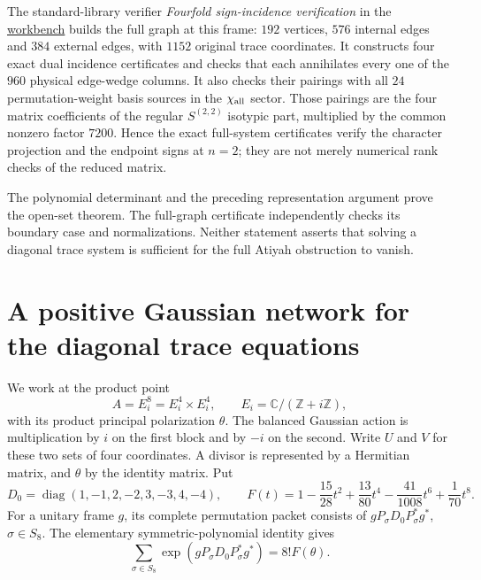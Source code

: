 \documentclass[11pt]{article}
\theoremstyle{definition}
\theoremstyle{remark}
\newcommand{\workbenchurl}{https://github.com/KokunoYumeto/algebraic-cycles-and-motives-workbench}
\begin{document}
The standard-library verifier
\emph{Fourfold sign-incidence verification} in the \href{\workbenchurl}{workbench} builds the full graph at this
frame: $192$ vertices, $576$ internal edges and $384$ external edges,
with $1152$ original trace coordinates.  It constructs four exact dual
incidence certificates and checks that each annihilates every one of the
$960$ physical edge-wedge columns.  It also checks their pairings with
all $24$ permutation-weight basis sources in the
$\chi_{\rm all}$ sector.  Those pairings are the four matrix
coefficients of the regular $S^{(2,2)}$ isotypic part, multiplied by the
common nonzero factor $7200$.  Hence the exact full-system certificates
verify the character projection and the endpoint signs at $n=2$;
they are not merely numerical rank checks of the reduced matrix.

The polynomial determinant and the preceding representation argument
prove the open-set theorem.  The full-graph certificate independently
checks its boundary case and normalizations.  Neither statement asserts
that solving a diagonal trace system is sufficient for the full Atiyah
obstruction to vanish.

\section{A positive Gaussian network for the diagonal trace equations}
\label{sec:gaussian-trace-network}

We work at the product point
\[
 A=E_i^8=E_i^4\times E_i^4,
 \qquad E_i=\mathbb C/(\mathbb Z+i\mathbb Z),
\]
with its product principal polarization \(\theta\).  The balanced
Gaussian action is multiplication by \(i\) on the first block and by
\(-i\) on the second.  Write \(U\) and \(V\) for these two sets of four
coordinates.  A divisor is represented by a Hermitian matrix, and
\(\theta\) by the identity matrix.  Put
\[
 D_0=\operatorname{diag}(1,-1,2,-2,3,-3,4,-4),\qquad
 F(t)=1-\frac{15}{28}t^2+\frac{13}{80}t^4
       -\frac{41}{1008}t^6+\frac1{70}t^8.
\]
For a unitary frame \(g\), its complete permutation packet consists
of \(gP_\sigma D_0P_\sigma^*g^*\), \(\sigma\in S_8\).
The elementary symmetric-polynomial identity gives
\begin{equation}
 \sum_{\sigma\in S_8}
   \exp(gP_\sigma D_0P_\sigma^*g^*)=8!F(\theta).
 \label{eq:trace-packet-average}
\end{equation}
\end{document}
